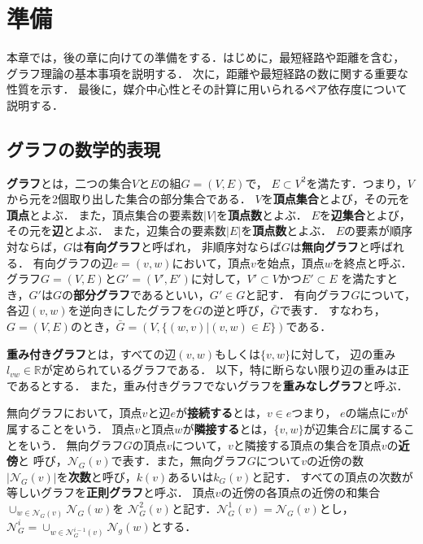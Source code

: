 \chapter{準備}
\label{chap:preliminary}
本章では，後の章に向けての準備をする．はじめに，最短経路や距離を含む，
グラフ理論の基本事項を説明する．
次に，距離や最短経路の数に関する重要な性質を示す．
最後に，媒介中心性とその計算に用いられるペア依存度について説明する．

\section{グラフの数学的表現}
\label{sect:graph-theory}

\textbf{グラフ}とは，二つの集合$V$と$E$の組$G=(V,E)$で，
$E\subset V^2$を満たす．つまり，$V$から元を2個取り出した集合の部分集合である．
$V$を\textbf{頂点集合}とよび，その元を\textbf{頂点}とよぶ．
また，頂点集合の要素数$|V|$を\textbf{頂点数}とよぶ．
$E$を\textbf{辺集合}とよび，その元を\textbf{辺}とよぶ．
また，辺集合の要素数$|E|$を\textbf{頂点数}とよぶ．
$E$の要素が順序対ならば，$G$は\textbf{有向グラフ}と呼ばれ，
非順序対ならば$G$は\textbf{無向グラフ}と呼ばれる．
有向グラフの辺$e=(v,w)$において，頂点$v$を始点，頂点$w$を終点と呼ぶ．
グラフ$G=(V,E)$と$G'=(V',E')$に対して，$V'\subset V$かつ$E'\subset E$
を満たすとき，$G'$は$G$の\textbf{部分グラフ}であるといい，$G'\in G$と記す．
有向グラフ$G$について，各辺$(v,w)$を逆向きにしたグラフを$G$の逆と呼び，$\bar{G}$で表す．
すなわち，$G=(V,E)$のとき，$\bar{G}=(V,\{(w,v)|(v,w)\in E\})$である．

\textbf{重み付きグラフ}とは，すべての辺$(v,w)$もしくは$\{v,w\}$に対して，
辺の重み$l_{vw}\in\mathbb{R}$が定められているグラフである．
以下，特に断らない限り辺の重みは正であるとする．
また，重み付きグラフでないグラフを\textbf{重みなしグラフ}と呼ぶ．

無向グラフにおいて，頂点$v$と辺$e$が\textbf{接続する}とは，$v\in e$つまり，
$e$の端点に$v$が属することをいう．
頂点$v$と頂点$w$が\textbf{隣接する}とは，$\{v,w\}$が辺集合$E$に属することをいう．
無向グラフ$G$の頂点$v$について，$v$と隣接する頂点の集合を頂点$v$の\textbf{近傍}と
呼び，$\mathcal{N}_G(v)$で表す．また，無向グラフ$G$について$v$の近傍の数
$|\mathcal{N}_G(v)|$を\textbf{次数}と呼び，$k(v)$あるいは$k_G(v)$と記す．
すべての頂点の次数が等しいグラフを\textbf{正則グラフ}と呼ぶ．
頂点$v$の近傍の各頂点の近傍の和集合$\cup_{w\in\mathcal{N}_G(v)}\mathcal{N}_G(w)$を
$\mathcal{N}_G^2(v)$と記す．$\mathcal{N}_G^1(v)=\mathcal{N}_G(v)$とし，
$\mathcal{N}_G^i=\cup_{w\in\mathcal{N}_G^{i-1}(v)}\mathcal{N}_g(w)$とする．

